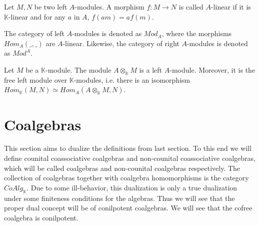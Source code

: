 \documentclass[../thesis.tex]{subfiles}
\begin{document}
\begin{definition}[Modules]
\begin{center}
                \end{center}
            \end{definition}

            \begin{definition}
                Let $M,N$ be two left $A$-modules. A morphism $f:M\rightarrow N$ is called $A$-linear if it is $\mathbb{K}$-linear and for any $a$ in $A$, $f(am) = af(m)$.
            \end{definition}

            The category of left $A$-modules is denoted as $Mod_A$, where the morphisms $Hom_A(\_,\_)$ are $A$-linear. Likewise, the category of right $A$-modules is denoted as $Mod^A$. 

            \begin{proposition}
                Let $M$ be a $\mathbb{K}$-module. The module $A\otimes_{\mathbb{K}}M$ is a left $A$-module. Moreover, it is the free left module over $\mathbb{K}$-modules, i.e. there is an isomorphism $Hom_{\mathbb{K}}(M,N)\simeq Hom_{A}(A\otimes_{\mathbb{K}}M,N)$.
            \end{proposition}
            
    \section{Coalgebras}
            This section aims to dualize the definitions from last section. To this end we will define counital coassociative coalgebras and non-counital coassociative coalgebras, which will be called coalgebras and non-counital coalgebras respectively. The collection of coalgebras together with coalgebra homomorphisms is the category $CoAlg_{\mathbb{K}}$. Due to some ill-behavior, this dualization is only a true dualization under some finiteness conditions for the algebras. Thus we will see that the proper dual concept will be of conilpotent coalgebras. We will see that the cofree coalgebra is conilpotent.
\end{document}
